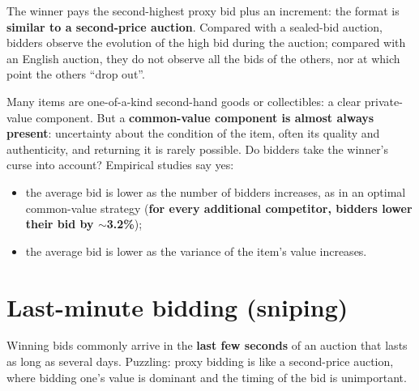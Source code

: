 \documentclass[11pt,a4paper,openany]{book}
\begin{document}
\begin{propbox}[title=eBay's format]
The winner pays the second-highest proxy bid plus an increment: the format is \textbf{similar
to a second-price auction}. Compared with a sealed-bid auction, bidders observe the evolution
of the high bid during the auction; compared with an English auction, they do not observe all
the bids of the others, nor at which point the others ``drop out''.
\end{propbox}

\begin{propbox}[title=Private value or common value?]
Many items are one-of-a-kind second-hand goods or collectibles: a clear private-value
component. But a \textbf{common-value component is almost always present}: uncertainty about
the condition of the item, often its quality and authenticity, and returning it is rarely
possible. Do bidders take the winner's curse into account? Empirical studies say yes:
\begin{itemize}
  \item the average bid is lower as the number of bidders increases, as in an optimal
        common-value strategy (\textbf{for every additional competitor, bidders lower their
        bid by $\sim$3.2\%});
  \item the average bid is lower as the variance of the item's value increases.
\end{itemize}
\end{propbox}


\section{Last-minute bidding (sniping)}

\begin{defnbox}[title=Sniping]
Winning bids commonly arrive in the \textbf{last few seconds} of an auction that lasts as
long as several days. Puzzling: proxy bidding is like a second-price auction, where bidding
one's value is dominant and the timing of the bid is unimportant.
\end{defnbox}
\end{document}
